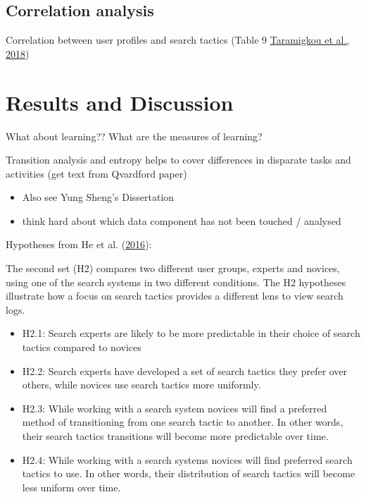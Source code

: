 \documentclass[letterpaper, nobind]{templates/ociamthesis}
\providecommand{\tightlist}{%
  \setlength{\itemsep}{0pt}\setlength{\parskip}{0pt}}
\begin{document}
\hypertarget{correlation-analysis}{%
\section{Correlation analysis}\label{correlation-analysis}}

Correlation between user profiles and search tactics (Table 9 \protect\hyperlink{ref-taramigkou2018leveraging}{Taramigkou et al., 2018})

\hypertarget{results-and-discussion}{%
\chapter{Results and Discussion}\label{results-and-discussion}}

What about learning??
What are the measures of learning?

Transition analysis and entropy helps to cover differences in disparate tasks and activities (get text from Qvardford paper)

\begin{itemize}
\tightlist
\item
  Also see Yung Sheng's Dissertation
\item
  think hard about which data component has not been touched / analysed
\end{itemize}

Hypotheses from He et al. (\protect\hyperlink{ref-he2016beyond}{2016}):

The second set (H2) compares two different user groups, experts and novices, using one of the search systems in two different conditions. The H2 hypotheses illustrate how a focus on search tactics provides a different lens to view search logs.

\begin{itemize}
\tightlist
\item
  H2.1: Search experts are likely to be more predictable in their choice of search tactics compared to novices
\item
  H2.2: Search experts have developed a set of search tactics they prefer over others, while novices use search tactics more uniformly.
\item
  H2.3: While working with a search system novices will find a preferred method of transitioning from one search tactic to another. In other words, their search tactics transitions will become more predictable over time.
\item
  H2.4: While working with a search systems novices will find preferred search tactics to use. In other words, their distribution of search tactics will become less uniform over time.
\end{itemize}
\end{document}
